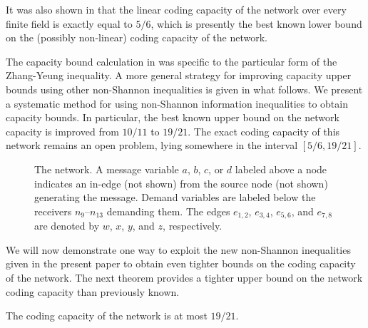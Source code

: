 \documentclass[10pt,journal]{IEEEtran}
\begin{document}
It was also shown in \cite{Dougherty-Freiling-Zeger06-Matroids}
that the linear coding
capacity of the \Vamos{} network over every finite field
is exactly equal to $5/6$,
which is presently the best known lower bound on the
(possibly non-linear) coding capacity of the \Vamos{} network.

The capacity bound calculation in \cite{Dougherty-Freiling-Zeger06-Matroids} was specific
to the particular form of the Zhang-Yeung inequality.
A more general strategy for improving capacity upper bounds
using other non-Shannon inequalities is given in what follows.
We present a systematic method
for using non-Shannon information inequalities to
obtain capacity bounds.
In particular,
the best known upper bound on the \Vamos{} network capacity is
improved from $10/11$ to $19/21$.
The exact coding capacity of this network remains an open problem,
lying somewhere in the interval $[5/6, 19/21]$.

%
\begin{figure}[h]
\begin{center}
\leavevmode
\hbox{\textwidth{}}
\end{center}
\caption{
The \Vamos{} network.
A message variable $a$, $b$, $c$, or $d$ labeled above a node
indicates an in-edge (not shown) from the source node (not shown) generating the  message.
Demand variables are labeled below the receivers $n_9$--$n_{13}$ demanding them.
The edges $e_{1,2}$, $e_{3,4}$, $e_{5,6}$, and $e_{7,8}$
are denoted by
$w$, $x$, $y$, and $z$,
respectively.
}
\label{fig:Vamos-network}
\end{figure}
%

We will now demonstrate one way to exploit the new non-Shannon inequalities given in
the present paper to obtain even tighter bounds on the coding
capacity of the \Vamos{} network.
The next theorem provides a tighter upper bound on the
\Vamos{} network coding capacity than previously known.

\begin{theorem}
The coding capacity of the \Vamos{} network is at most $19/21$.
\label{thm:Vamos-bound}
\end{theorem}
\end{document}
